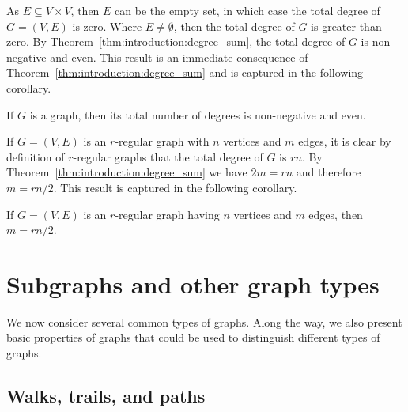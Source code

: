 As $E \subseteq V \times V$, then $E$ can be the empty set, in which
case the total degree of $G = (V, E)$ is zero. Where $E \neq
\emptyset$, then the total degree of $G$ is greater than zero. By
Theorem~\ref{thm:introduction:degree_sum}, the total degree of $G$ is
non-negative and even. This result is an immediate consequence of
Theorem~\ref{thm:introduction:degree_sum} and is captured in the
following corollary.

\begin{corollary}
\label{cor:introduction:degree_sum_even}
If $G$ is a graph, then its total number of degrees is non-negative
and even.
\end{corollary}

If $G = (V, E)$ is an $r$-regular graph with $n$ vertices and $m$
edges, it is clear by definition of $r$-regular graphs that the total
degree of $G$ is $rn$. By Theorem~\ref{thm:introduction:degree_sum} we
have $2m = rn$ and therefore $m = rn / 2$. This result is captured in
the following corollary.

\begin{corollary}
If $G = (V, E)$ is an $r$-regular graph having $n$ vertices and $m$
edges, then $m = rn / 2$.
\end{corollary}



\section{Subgraphs and other graph types}
\label{sec:introduction:subgraphs_graph_types}

We now consider several common types of graphs. Along the way, we also
present basic properties of graphs that could be used to distinguish
different types of graphs.



\subsection{Walks, trails, and paths}
\label{subsec:introduction:walks_trails_paths}

